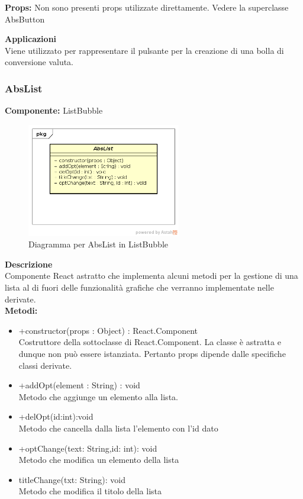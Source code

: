 \textbf{Props:} 
Non sono presenti props utilizzate direttamente. Vedere la superclasse AbsButton 


\textbf{Applicazioni}\\
Viene utilizzato per rappresentare il pulsante per la creazione di una bolla di conversione valuta. 


\clearpage

\subsubsection{AbsList}
\textbf{Componente:}  ListBubble\\
   \FloatBarrier
   \begin{figure}[ht]
   \centering
   \includegraphics[width=0.6\textwidth]{img/single-AbsList.png}
   \caption{{Diagramma per AbsList in ListBubble}}
\end{figure}
\FloatBarrier
\textbf{Descrizione}\\
Componente React astratto che implementa alcuni metodi per la gestione di una lista al di fuori delle funzionalità grafiche che verranno implementate nelle derivate.
\\
\textbf{Metodi:} 
\begin{itemize}
\item +constructor(props : Object) : React.Component 
\\
Costruttore della sottoclasse di React.Component. La classe è astratta e dunque non può essere istanziata. Pertanto props dipende dalle specifiche classi derivate.

\item +addOpt(element : String) : void 
\\
Metodo che aggiunge un elemento alla lista.
\item +delOpt(id:int):void
\\
Metodo che cancella dalla lista l'elemento con l'id dato
\item +optChange(text: String,id: int): void
\\
Metodo che modifica un elemento della lista
\item titleChange(txt: String): void
\\
Metodo che modifica il titolo della lista

\end{itemize} 


